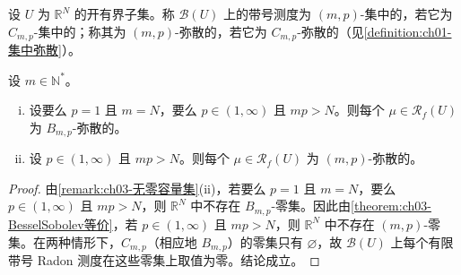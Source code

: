 \documentclass[../../main.tex]{subfiles}%
\begin{document}
设 $U$ 为 $\mathbb{R}^N$ 的开有界子集。称 $\mathcal{B}(U)$ 上的带号测度为 $(m,p)$-集中的，若它为 $C_{m,p}$-集中的；称其为 $(m,p)$-弥散的，若它为 $C_{m,p}$-弥散的（见\cref{definition:ch01-集中弥散}）。

\begin{proposition}\label{proposition:ch03-无非平凡集中}
设 $m\in\mathbb{N}^*$。
\begin{enumerate}[(i)]
\item 设要么 $p=1$ 且 $m=N$，要么 $p\in(1,\infty)$ 且 $mp>N$。则每个 $\mu\in\mathscr{R}_f(U)$ 为 $B_{m,p}$-弥散的。
\item 设 $p\in(1,\infty)$ 且 $mp>N$。则每个 $\mu\in\mathscr{R}_f(U)$ 为 $(m,p)$-弥散的。
\end{enumerate}
\end{proposition}

\begin{proof}
由\cref{remark:ch03-无零容量集}(ii)，若要么 $p=1$ 且 $m=N$，要么 $p\in(1,\infty)$ 且 $mp>N$，则 $\mathbb{R}^N$ 中不存在 $B_{m,p}$-零集。因此由\cref{theorem:ch03-BesselSobolev等价}，若 $p\in(1,\infty)$ 且 $mp>N$，则 $\mathbb{R}^N$ 中不存在 $(m,p)$-零集。在两种情形下，$C_{m,p}$（相应地 $B_{m,p}$）的零集只有 $\varnothing$，故 $\mathcal{B}(U)$ 上每个有限带号 Radon 测度在这些零集上取值为零。结论成立。
\end{proof}
\end{document}
